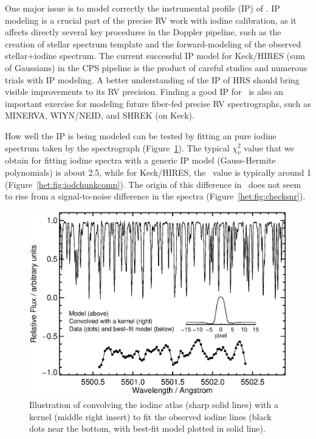 
One major issue is to model correctly the instrumental profile (IP) of
\het. IP modeling is a crucial part of the precise RV work with iodine
calibration, as it affects directly several key procedures in the
Doppler pipeline, such as the creation of stellar spectrum template
and the forward-modeling of the observed stellar$+$iodine
spectrum. The current
successful IP model for Keck/HIRES (sum of Gaussians) in the CPS
pipeline is the product of careful studies and numerous trials with IP
modeling. A better understanding of the IP of HRS should bring visible
improvements to its RV precision. Finding a good IP for \het\ is also
an important exercise for modeling future fiber-fed precise RV
spectrographs, such as MINERVA, WIYN/NEID, and SHREK (on Keck).

How well the IP is being modeled can be tested by fitting an pure
iodine spectrum taken by the spectrograph
(Figure~\ref{het:fig:convkernel}). The typical $\chi_\nu^2$ value that
we obtain for fitting iodine spectra with a generic IP model
(Gauss-Hermite polynomials) is about 2.5, while for Keck/HIRES, the
\chisq\ value is typically around 1
(Figure~\ref{het:fig:iodchunkcomp}). The origin of this difference in
\chisq\ does not seem to rise from a signal-to-noise difference in the
spectra (Figure~\ref{het:fig:checksnr}).


\begin{figure}
\centering
\includegraphics[scale=0.45]{het/convolution_kernel.eps}
\caption{Illustration of convolving the iodine atlas (sharp solid
  lines) with a kernel (middle right insert) to fit the observed
  iodine lines (black dots near the bottom, with best-fit model
  plotted in solid line).
\label{het:fig:convkernel}}
\end{figure}



